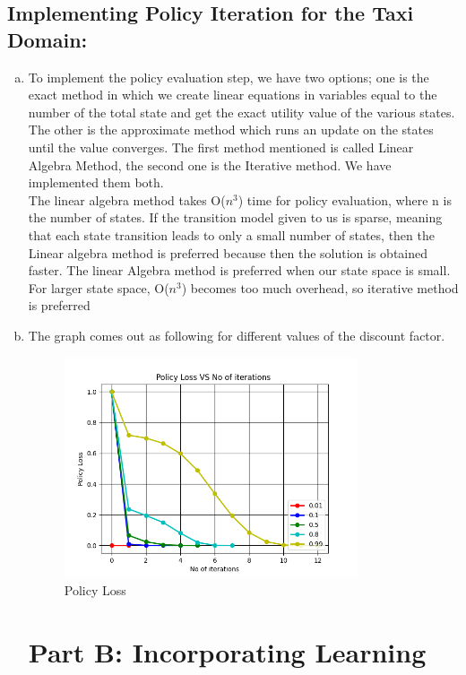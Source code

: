 \documentclass{article}
\begin{document}
\subsection{Implementing Policy Iteration for the Taxi Domain:}
\begin{enumerate}[a)]
    \item To implement the policy evaluation step, we have two options; one is the exact method in which we create linear equations in variables equal to the number of the total state and get the exact utility value of the various states. The other is the approximate method which runs an update on the states until the value converges.
The first method mentioned is called Linear Algebra Method, the second one is the Iterative method. We have implemented them both. \\
The linear algebra method takes O($n^3$) time for policy evaluation, where n is the number of states. If the transition model given to us is sparse, meaning that each state transition leads to only a small number of states, then the Linear algebra method is preferred because then the solution is obtained faster. The linear Algebra method is preferred when our state space is small. For larger state space, O($n^3$) becomes too much overhead, so iterative method is preferred
    \item The graph comes out as following for different values of the discount factor.
    \begin{center}
        \begin{figure}[h]
\hfill\includegraphics[height=6.5cm]{QA3b.png}\hspace*{\fill}
    \caption{Policy Loss}
    \label{fig:Policy Loss}
\end{figure}
\end{center}

\pagebreak

\section{Part B: Incorporating Learning}



\end{enumerate}
\end{document}
